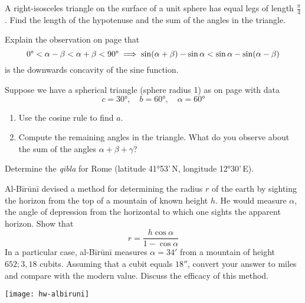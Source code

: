 \begin{exercises}{}{}
	\exstart A right-isosceles triangle on the surface of a unit sphere has equal legs of length $\frac\pi 4$. Find the length of the hypotenuse and the sum of the angles in the triangle. 
	\begin{enumerate}\setcounter{enumi}{1}
	  \item Explain the observation on page \pageref{pg:sineconcave} that
		\[
			\ang 0<\alpha-\beta<\alpha+\beta<\ang{90}\implies\sin(\alpha+\beta)-\sin\alpha<\sin\alpha-\sin(\alpha-\beta)
		\]
		is the downwards concavity of the sine function.
		
		\item Suppose we have a spherical triangle (sphere radius 1) as on page \pageref{pg:qiblacosinerule} with data
		\[
			c=\ang{30},\quad b=\ang{60},\quad \alpha=\ang{60}
		\]
		\begin{enumerate}
		  \item Use the cosine rule to find $a$.
		  \item Compute the remaining angles in the triangle. What do you observe about the sum of the angles $\alpha+\beta+\gamma$?
		\end{enumerate}
	
	  \item%
		Determine the \emph{qibla} for Rome (latitude \ang{41}53'\,N, longitude \ang{12}30'\,E).
	  
	  \begin{minipage}[t]{0.7\linewidth}\vspace{0pt}
		\item%
		Al-Bīrūnī devised a method for determining the radius $r$ of the earth by sighting the horizon from the top of a mountain of known height $h$. He would measure $\alpha$, the angle of depression from the horizontal to which one sights the apparent horizon. Show that
	  \[
	  	r=\frac{h\cos\alpha}{1-\cos\alpha}
	  \]
	  In a particular case, al-Bīrūnī measures $\alpha=34'$ from a mountain of height $652;3,18$ cubits. Assuming that a cubit equals $18''$, convert your answer to miles and compare with the modern value. Discuss the efficacy of this method.
	  \end{minipage}
	  \hfill
	  \begin{minipage}[t]{0.29\linewidth}\vspace{0pt}
	  	\flushright
	  	\texttt{[image: hw-albiruni]}
	  \end{minipage}
	  

\end{enumerate}
\end{exercises}
